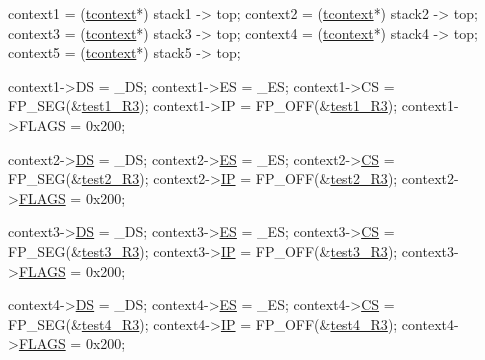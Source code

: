 \begin{DoxyCode}
        context1 = (\hyperlink{structcontext}{tcontext}*) stack1 -> top;
        context2 = (\hyperlink{structcontext}{tcontext}*) stack2 -> top;
        context3 = (\hyperlink{structcontext}{tcontext}*) stack3 -> top;
        context4 = (\hyperlink{structcontext}{tcontext}*) stack4 -> top;
        context5 = (\hyperlink{structcontext}{tcontext}*) stack5 -> top;
        
        
        
        context1->DS = \_DS;
        context1->ES = \_ES;
        context1->CS = FP\_SEG(&\hyperlink{procs-r3_8c_ae4496e9c01adc7562ce34516c13226a0}{test1_R3});
        context1->IP = FP\_OFF(&\hyperlink{procs-r3_8c_ae4496e9c01adc7562ce34516c13226a0}{test1_R3});
        context1->FLAGS = 0x200;
        
        context2->\hyperlink{structcontext_a657e73663a4443be61a078d31c28ee3e}{DS} = \_DS;
        context2->\hyperlink{structcontext_a81a78fef7bda3a5dd852b28a905890ab}{ES} = \_ES;
        context2->\hyperlink{structcontext_a0b41903d1fa3b4e1ce892f59480323b5}{CS} = FP\_SEG(&\hyperlink{procs-r3_8c_ab61a49e4507b3dba1bfad0cc9510d0a6}{test2_R3});
        context2->\hyperlink{structcontext_a02ac427e75af0dfe7d649dc8821cde0a}{IP} = FP\_OFF(&\hyperlink{procs-r3_8c_ab61a49e4507b3dba1bfad0cc9510d0a6}{test2_R3});
        context2->\hyperlink{structcontext_a251dc5ae40a989bef945d2df6925f9a3}{FLAGS} = 0x200;
        
        context3->\hyperlink{structcontext_a657e73663a4443be61a078d31c28ee3e}{DS} = \_DS;
        context3->\hyperlink{structcontext_a81a78fef7bda3a5dd852b28a905890ab}{ES} = \_ES;
        context3->\hyperlink{structcontext_a0b41903d1fa3b4e1ce892f59480323b5}{CS} = FP\_SEG(&\hyperlink{procs-r3_8c_a453a58ecc6482a24bf02e7caf67aa41a}{test3_R3});
        context3->\hyperlink{structcontext_a02ac427e75af0dfe7d649dc8821cde0a}{IP} = FP\_OFF(&\hyperlink{procs-r3_8c_a453a58ecc6482a24bf02e7caf67aa41a}{test3_R3});
        context3->\hyperlink{structcontext_a251dc5ae40a989bef945d2df6925f9a3}{FLAGS} = 0x200;
        
        context4->\hyperlink{structcontext_a657e73663a4443be61a078d31c28ee3e}{DS} = \_DS;
        context4->\hyperlink{structcontext_a81a78fef7bda3a5dd852b28a905890ab}{ES} = \_ES;
        context4->\hyperlink{structcontext_a0b41903d1fa3b4e1ce892f59480323b5}{CS} = FP\_SEG(&\hyperlink{procs-r3_8c_aaa737ca092fa5d35b33665401852fb7b}{test4_R3});
        context4->\hyperlink{structcontext_a02ac427e75af0dfe7d649dc8821cde0a}{IP} = FP\_OFF(&\hyperlink{procs-r3_8c_aaa737ca092fa5d35b33665401852fb7b}{test4_R3});
        context4->\hyperlink{structcontext_a251dc5ae40a989bef945d2df6925f9a3}{FLAGS} = 0x200;
        

\end{DoxyCode}

